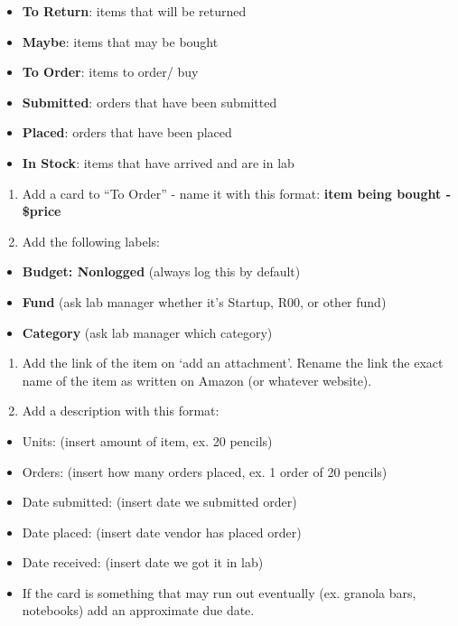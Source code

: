 \documentclass[
]{book}
\providecommand{\tightlist}{%
  \setlength{\itemsep}{0pt}\setlength{\parskip}{0pt}}
\begin{document}
\begin{itemize}
\tightlist
\item
  \textbf{To Return}: items that will be returned
\item
  \textbf{Maybe}: items that may be bought
\item
  \textbf{To Order}: items to order/ buy
\item
  \textbf{Submitted}: orders that have been submitted
\item
  \textbf{Placed}: orders that have been placed
\item
  \textbf{In Stock}: items that have arrived and are in lab
\end{itemize}

\begin{enumerate}
\def\labelenumi{\arabic{enumi}.}
\setcounter{enumi}{1}
\item
  Add a card to ``To Order'' - name it with this format: \textbf{item being bought - \$price}
\item
  Add the following labels:
\end{enumerate}

\begin{itemize}
\tightlist
\item
  \textbf{Budget: Nonlogged} (always log this by default)
\item
  \textbf{Fund} (ask lab manager whether it's Startup, R00, or other fund)
\item
  \textbf{Category} (ask lab manager which category)
\end{itemize}

\begin{enumerate}
\def\labelenumi{\arabic{enumi}.}
\setcounter{enumi}{3}
\item
  Add the link of the item on `add an attachment'. Rename the link the exact name of the item as written on Amazon (or whatever website).
\item
  Add a description with this format:
\end{enumerate}

\begin{itemize}
\tightlist
\item
  Units: (insert amount of item, ex. 20 pencils)
\item
  Orders: (insert how many orders placed, ex. 1 order of 20 pencils)
\item
  Date submitted: (insert date we submitted order)
\item
  Date placed: (insert date vendor has placed order)
\item
  Date received: (insert date we got it in lab)
\item
  If the card is something that may run out eventually (ex. granola bars, notebooks) add an approximate due date.
\end{itemize}
\end{document}
